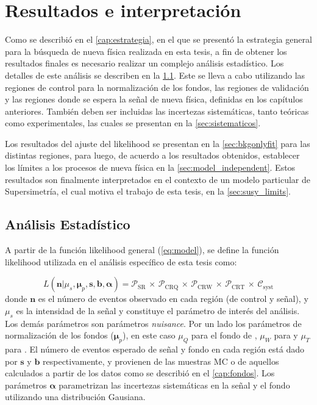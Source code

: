 \chapter{Resultados e interpretación}
\label{cap:resultados}

Como se describió en el \cref{cap:estrategia}, en el que se presentó la
estrategia general para la búsqueda de nueva física realizada en esta tesis, a
fin de obtener los resultados finales es necesario realizar un complejo análisis
estadístico. Los detalles de este análisis se describen en la
\cref{sec:analisis}. Este se lleva a cabo utilizando las regiones de control
para la normalización de los fondos, las regiones de validación y las regiones
donde se espera la señal de nueva física, definidas en los capítulos anteriores.
También deben ser incluidas las incertezas sistemáticas, tanto teóricas como
experimentales, las cuales se presentan en la \cref{sec:sistematicos}.

Los resultados del ajuste del likelihood se presentan en la
\cref{sec:bkgonlyfit} para las distintas regiones, para luego, de acuerdo a los
resultados obtenidos, establecer los límites a los procesos de nueva física en
la \cref{sec:model_independent}. Estos resultados son finalmente interpretados
en el contexto de un modelo particular de Supersimetría, el cual motiva el
trabajo de esta tesis, en la \cref{sec:susy_limits}.



\section{Análisis Estadístico}
\label{sec:analisis}

A partir de la función likelihood general (\cref{eq:model}), se define la
función likelihood utilizada en el análisis específico de esta tesis como:

\begin{equation}
  L(\bm{n}|\mu_s, \bm{\mu}_p, \bm{s}, \bm{b}, \bm{\alpha}) = \mathcal{P}_\text{SR} \, \times \, \mathcal{P}_\text{CRQ} \, \times \, \mathcal{P}_\text{CRW} \, \times \, \mathcal{P}_\text{CRT} \, \times \, \mathcal{C}_\text{syst}
  \label{eq:likelihood}
\end{equation}
%
donde $\bm{n}$ es el número de eventos observado en cada región (de control y
señal), y $\mu_s$ es la intensidad de la señal y constituye el parámetro de
interés del análisis. Los demás parámetros son parámetros \emph{nuisance}. Por
un lado los parámetros de normalización de los fondos ($\bm{\mu}_p$), en este
caso $\mu_Q$ para el fondo de {\gjet}, $\mu_W$ para {\wgam} y $\mu_T$ para
{\ttgam}. El número de eventos esperado de señal y fondo en cada región está
dado por $\bm{s}$ y $\bm{b}$ respectivamente, y provienen de las muestras MC o
de aquellos calculados a partir de los datos como se describió en el
\cref{cap:fondos}. Los parámetros $\bm{\alpha}$ parametrizan las incertezas
sistemáticas en la señal y el fondo utilizando una distribución Gausiana.

